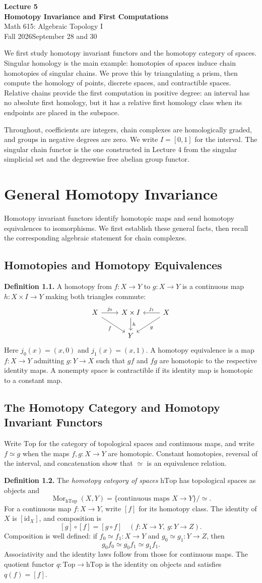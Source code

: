 \documentclass[11pt]{article}
\newcommand{\coursebold}[1]{{\color{burgundy}\textbf{#1}}}
\newcommand{\coursetitle}[3]{\begin{center}{\large\bfseries\color{teal}#1}\\[4pt]{\LARGE\bfseries\color{teal}#2}\\[6pt]Math 615: Algebraic Topology I\\Fall 2026\quad\textbar\quad #3\end{center}}
\newcommand{\coursecontents}{{\small\setlength{\parskip}{0pt}\tableofcontents}}
\newcommand{\facehead}[1]{\subsection{#1}}
\begin{document}
\coursetitle{Lecture 5}{Homotopy Invariance and First Computations}{September 28 and 30}
We first study homotopy invariant functors and the homotopy category of spaces. Singular homology is the main example: homotopies of spaces induce chain homotopies of singular chains. We prove this by triangulating a prism, then compute the homology of points, discrete spaces, and contractible spaces. Relative chains provide the first computation in positive degree: an interval has no absolute first homology, but it has a relative first homology class when its endpoints are placed in the subspace.

Throughout, coefficients are integers, chain complexes are homologically graded, and groups in negative degrees are zero. We write $I=[0,1]$ for the interval. The singular chain functor is the one constructed in Lecture 4 from the singular simplicial set and the degreewise free abelian group functor.
\coursecontents
\section{General Homotopy Invariance}\label{sec:definitions}
Homotopy invariant functors identify homotopic maps and send homotopy equivalences to isomorphisms. We first establish these general facts, then recall the corresponding algebraic statement for chain complexes.

\facehead{Homotopies and Homotopy Equivalences}
\coursebold{Definition 1.1.} A homotopy from $f:X\to Y$ to $g:X\to Y$ is a continuous map $h:X\times I\to Y$ making both triangles commute:
\[
\begin{tikzcd}
X \arrow[r,"j_0"] \arrow[dr,"f"'] & X\times I \arrow[d,"h"] & X\arrow[l,"j_1"']\arrow[dl,"g"]\\
&Y&
\end{tikzcd}
\]
Here $j_0(x)=(x,0)$ and $j_1(x)=(x,1)$. A homotopy equivalence is a map $f:X\to Y$ admitting $g:Y\to X$ such that $gf$ and $fg$ are homotopic to the respective identity maps. A nonempty space is contractible if its identity map is homotopic to a constant map.

\facehead{The Homotopy Category and Homotopy Invariant Functors}
Write $\mathrm{Top}$ for the category of topological spaces and continuous maps, and write $f\simeq g$ when the maps $f,g:X\to Y$ are homotopic. Constant homotopies, reversal of the interval, and concatenation show that $\simeq$ is an equivalence relation.

\hypertarget{def:htop}{}\coursebold{Definition 1.2.} The \emph{homotopy category of spaces} $\mathrm{hTop}$ has topological spaces as objects and
\[
\operatorname{Mor}_{\mathrm{hTop}}(X,Y)
=\{\text{continuous maps }X\to Y\}/\simeq.
\]
For a continuous map $f:X\to Y$, write $[f]$ for its homotopy class. The identity of $X$ is $[\mathrm{id}_X]$, and composition is
\[
[g]\circ[f]=[g\circ f]
\quad(f:X\to Y,\ g:Y\to Z).
\]
Composition is well defined: if $f_0\simeq f_1:X\to Y$ and $g_0\simeq g_1:Y\to Z$, then
\[
g_0f_0\simeq g_0f_1\simeq g_1f_1.
\]
Associativity and the identity laws follow from those for continuous maps. The quotient functor $q:\mathrm{Top}\to\mathrm{hTop}$ is the identity on objects and satisfies $q(f)=[f]$.
\end{document}
